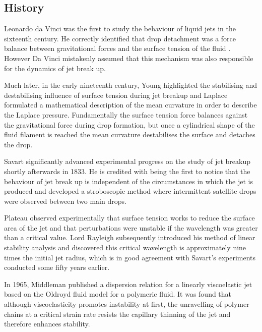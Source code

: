 \documentclass[11pt]{article}
\begin{document}
\subsection{History}
Leonardo da Vinci was the first to study the behaviour of liquid jets in the sixteenth century. He correctly identified that drop detachment was a force balance between gravitational forces and the surface tension of the fluid \cite{da1999codex}. However Da Vinci mistakenly assumed that this mechanism was also responsible for the dynamics of jet break up.

Much later, in the early nineteenth century, Young \cite{young1805essay} highlighted the stabilising and destabilising influence of surface tension during jet breakup and Laplace \cite{laplace1805traite} formulated a mathematical description of the mean curvature in order to describe the Laplace pressure. Fundamentally the surface tension force balances against the gravitational force during drop formation, but once a cylindrical shape of the fluid filament is reached the mean curvature destabilises the surface and detaches the drop.

Savart \cite{savart1833memoire} significantly advanced experimental progress on the study of jet breakup shortly afterwards in 1833. He is credited with being the first to notice that the behaviour of jet break up is independent of the circumstances in which the jet is produced and developed a stroboscopic method where intermittent satellite drops were observed between two main drops. 

Plateau \cite{plateau1873statique} observed experimentally that surface tension works to reduce the surface area of the jet and that perturbations were unstable if the wavelength was greater than a critical value. Lord Rayleigh \cite{strutt1878instability} subsequently introduced his method of linear stability analysis and discovered this critical wavelength is approximately nine times the initial jet radius, which is in good agreement with Savart's experiments conducted some fifty years earlier.

In 1965, Middleman \cite{middleman1965stability} published a dispersion relation for a linearly viscoelastic jet based on the Oldroyd fluid model for a polymeric fluid. It was found that although viscoelasticity promotes instability at first, the unravelling of polymer chains at a critical strain rate resists the capillary thinning of the jet and therefore enhances stability.
\end{document}
